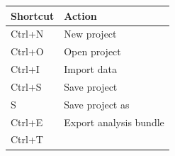 \documentclass[
  10pt,
  a4paper,
  oneside]{scrreprt}
\begin{document}
\begin{longtable}[]{@{}ll@{}}
\toprule
\begin{minipage}[b]{0.47\columnwidth}\raggedright
Shortcut\strut
\end{minipage} & \begin{minipage}[b]{0.47\columnwidth}\raggedright
Action\strut
\end{minipage}\tabularnewline
\midrule
\endhead
\begin{minipage}[t]{0.47\columnwidth}\raggedright
Ctrl+N\strut
\end{minipage} & \begin{minipage}[t]{0.47\columnwidth}\raggedright
New project\strut
\end{minipage}\tabularnewline
\begin{minipage}[t]{0.47\columnwidth}\raggedright
Ctrl+O\strut
\end{minipage} & \begin{minipage}[t]{0.47\columnwidth}\raggedright
Open project\strut
\end{minipage}\tabularnewline
\begin{minipage}[t]{0.47\columnwidth}\raggedright
Ctrl+I\strut
\end{minipage} & \begin{minipage}[t]{0.47\columnwidth}\raggedright
Import data\strut
\end{minipage}\tabularnewline
\begin{minipage}[t]{0.47\columnwidth}\raggedright
Ctrl+S\strut
\end{minipage} & \begin{minipage}[t]{0.47\columnwidth}\raggedright
Save project\strut
\end{minipage}\tabularnewline
\begin{minipage}[t]{0.47\columnwidth}\raggedright
S\strut
\end{minipage} & \begin{minipage}[t]{0.47\columnwidth}\raggedright
Save project as\strut
\end{minipage}\tabularnewline
\begin{minipage}[t]{0.47\columnwidth}\raggedright
Ctrl+E\strut
\end{minipage} & \begin{minipage}[t]{0.47\columnwidth}\raggedright
Export analysis bundle\strut
\end{minipage}\tabularnewline
\begin{minipage}[t]{0.47\columnwidth}\raggedright
Ctrl+T\strut
\end{minipage} & \begin{minipage}[t]{0.47\columnwidth}\raggedright

\end{minipage}
\end{longtable}
\end{document}
